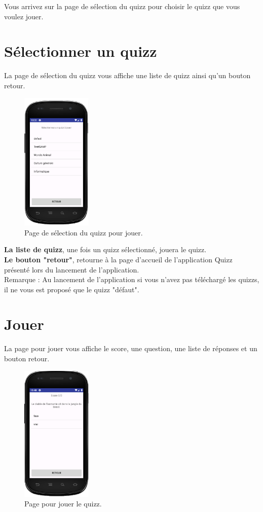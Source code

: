 \documentclass[a4paper]{report}
\begin{document}
Vous arrivez sur la page de sélection du quizz pour choisir le quizz que vous voulez jouer.

\section{Sélectionner un quizz}
La page de sélection du quizz vous affiche une liste de quizz ainsi qu'un bouton retour.

\begin{figure}[h]
\centering
\includegraphics[width=0.3\textwidth]{jouerSelectQuizz.png}
\caption{\label{fig:Sélection du quizz pour jouer}Page de sélection du quizz pour jouer.}
\end{figure}

\textbf{La liste de quizz}, une fois un quizz sélectionné, jouera le quizz.\\
\textbf{Le bouton "retour"}, retourne à la page d'accueil de l'application Quizz présenté lors du lancement de l'application.\\

Remarque : Au lancement de l'application si vous n'avez pas téléchargé les quizzs, il ne vous est proposé que le quizz "défaut".


\newpage
\section{Jouer}
La page pour jouer vous affiche le score, une question, une liste de réponses et un bouton retour.

\begin{figure}[h]
\centering
\includegraphics[width=0.3\textwidth]{jouer.png}
\caption{\label{fig:Jouer}Page pour jouer le quizz.}
\end{figure}
\end{document}
